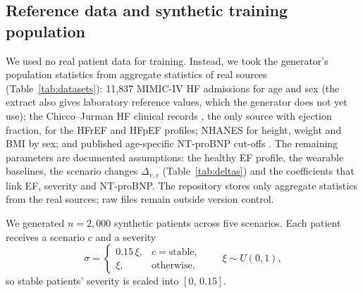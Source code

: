 \documentclass[conference]{IEEEtran}
\begin{document}
\subsection{Reference data and synthetic training population}\label{sec:data}
We used no real patient data for training. Instead, we took the generator's population statistics from aggregate statistics of real sources (Table~\ref{tab:datasets}): 11,837 MIMIC-IV HF admissions \cite{johnson2023mimiciv} for age and sex (the extract also gives laboratory reference values, which the generator does not yet use); the Chicco--Jurman HF clinical records \cite{chicco2020hf}, the only source with ejection fraction, for the HFrEF and HFpEF profiles; NHANES for height, weight and BMI by sex; and published age-specific NT-proBNP cut-offs \cite{januzzi2006icon}. The remaining parameters are documented assumptions: the healthy EF profile, the wearable baselines, the scenario changes $\Delta_{v,c}$ (Table~\ref{tab:deltas}) and the coefficients that link EF, severity and NT-proBNP. The repository stores only aggregate statistics from the real sources; raw files remain outside version control.

We generated $n=2{,}000$ synthetic patients across five scenarios. Each patient receives a scenario $c$ and a severity
\begin{equation}
\sigma=\begin{cases}0.15\,\xi, & c=\text{stable},\\ \xi, & \text{otherwise},\end{cases}\qquad \xi\sim U(0,1),
\label{eq:severity}
\end{equation}
so stable patients' severity is scaled into $[0,\,0.15]$.
\end{document}
